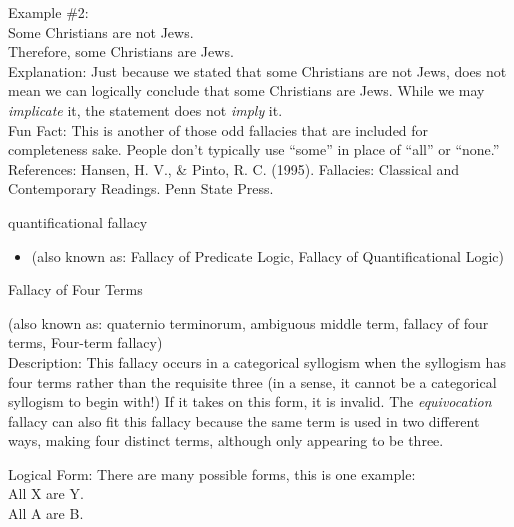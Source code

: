 \documentclass[a4paper,12pt,single,pdftex]{scrartcl}
\begin{document}
    
      Example \#2:
    \\

    
      Some Christians are not Jews.
    \\

    
      Therefore, some Christians are Jews.
    \\

    
      Explanation: Just because we stated that some Christians are not  Jews, does not mean we can logically conclude that some Christians are Jews.  While we may {\it implicate} it, the statement does not {\it imply}  it.
    \\

    
      Fun Fact: This is another of those odd fallacies that are included for completeness sake. People don’t typically use “some” in place of “all” or “none.”
    \\

    References: Hansen, H. V., \& Pinto, R. C. (1995). Fallacies: Classical and Contemporary Readings. Penn State Press.
  

quantificational fallacy
    \begin{itemize}
  \item 
        (also known as: Fallacy of Predicate Logic, Fallacy of Quantificational Logic)
      
    \end{itemize}
  
  

Fallacy of Four Terms
    
      (also known as: quaternio terminorum, ambiguous middle term, fallacy of four terms, Four-term fallacy)
    \\

  
    Description: This fallacy occurs in a categorical syllogism when the syllogism has four terms rather than the requisite three (in a sense, it cannot be a categorical syllogism to begin with!)  If it takes on this form, it is invalid.  The {\it equivocation} fallacy can also fit this fallacy because the same term is used in two different ways, making four distinct terms, although only appearing to be three.

    
      Logical Form: There are many possible forms, this is one example:
    \\

    
      All X are Y.
    \\

    
      All A are B.
    \\
\end{document}
